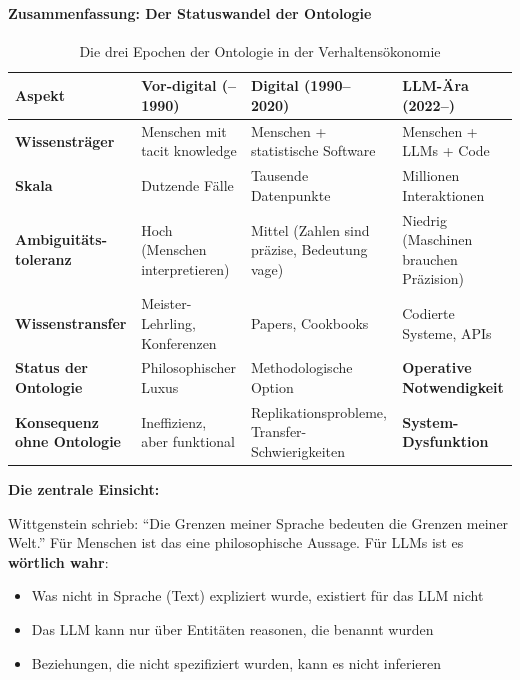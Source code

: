 \paragraph{Zusammenfassung: Der Statuswandel der Ontologie}

\begin{table}[h]
\centering
\caption{Die drei Epochen der Ontologie in der Verhaltensökonomie}
\begin{tabular}{@{}p{3cm}p{4cm}p{4cm}p{4cm}@{}}
\toprule
\textbf{Aspekt} & \textbf{Vor-digital (--1990)} & \textbf{Digital (1990--2020)} & \textbf{LLM-Ära (2022--)} \\
\midrule
\textbf{Wissensträger} & Menschen mit tacit knowledge & Menschen + statistische Software & Menschen + LLMs + Code \\
\textbf{Skala} & Dutzende Fälle & Tausende Datenpunkte & Millionen Interaktionen \\
\textbf{Ambiguitäts-toleranz} & Hoch (Menschen interpretieren) & Mittel (Zahlen sind präzise, Bedeutung vage) & Niedrig (Maschinen brauchen Präzision) \\
\textbf{Wissenstransfer} & Meister-Lehrling, Konferenzen & Papers, Cookbooks & Codierte Systeme, APIs \\
\textbf{Status der Ontologie} & Philosophischer Luxus & Methodologische Option & \textbf{Operative Notwendigkeit} \\
\textbf{Konsequenz ohne Ontologie} & Ineffizienz, aber funktional & Replikationsprobleme, Transfer-Schwierigkeiten & \textbf{System-Dysfunktion} \\
\bottomrule
\end{tabular}
\end{table}

\textbf{Die zentrale Einsicht:}

Wittgenstein schrieb: ``Die Grenzen meiner Sprache bedeuten die Grenzen meiner Welt.'' Für Menschen ist das eine philosophische Aussage. Für LLMs ist es \textbf{wörtlich wahr}:
\begin{itemize}
    \item Was nicht in Sprache (Text) expliziert wurde, existiert für das LLM nicht
    \item Das LLM kann nur über Entitäten reasonen, die benannt wurden
    \item Beziehungen, die nicht spezifiziert wurden, kann es nicht inferieren
\end{itemize}

